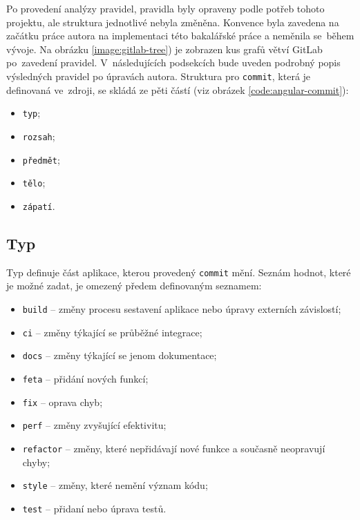     Po provedení analýzy pravidel, pravidla byly opraveny podle potřeb tohoto projektu, ale struktura jednotlivé nebyla změněna. Konvence byla zavedena na začátku práce autora na implementaci této bakalářské práce a neměnila se~během vývoje. Na obrázku \ref{image:gitlab-tree}) je zobrazen kus grafů větví GitLab po~zavedení pravidel. V~následujících podsekcích bude uveden podrobný popis výsledných pravidel po úpravách autora. Struktura pro \verb|commit|, která je definovaná ve~zdroji, se skládá ze pěti částí (viz obrázek \ref{code:angular-commit}):
    \begin{itemize}
    \setlength\itemsep{0.3em}
        \item \texttt{typ};
        \item \texttt{rozsah};
        \item \texttt{předmět};
        \item \texttt{tělo};
        \item \texttt{zápatí}.
    \end{itemize}
    
    \subsection{Typ}
        Typ definuje část aplikace, kterou provedený \verb|commit| mění. Seznám hodnot, které je možné zadat, je omezený předem definovaným seznamem:
        \begin{itemize}
        \setlength\itemsep{0.3em}
            \item \texttt{build} -- změny procesu sestavení aplikace nebo úpravy externích závislostí;
            \item \texttt{ci} -- změny týkající se průběžné integrace;
            \item \texttt{docs} -- změny týkající se jenom dokumentace;
            \item \texttt{feta} -- přidání nových funkcí;
            \item \texttt{fix} -- oprava chyb;
            \item \texttt{perf} -- změny zvyšující efektivitu;
            \item \texttt{refactor} -- změny, které nepřidávají nové funkce a současně neopravují chyby;
            \item \texttt{style} -- změny, které nemění význam kódu;
            \item \texttt{test} -- přidaní nebo úprava testů.
        \end{itemize}
    
